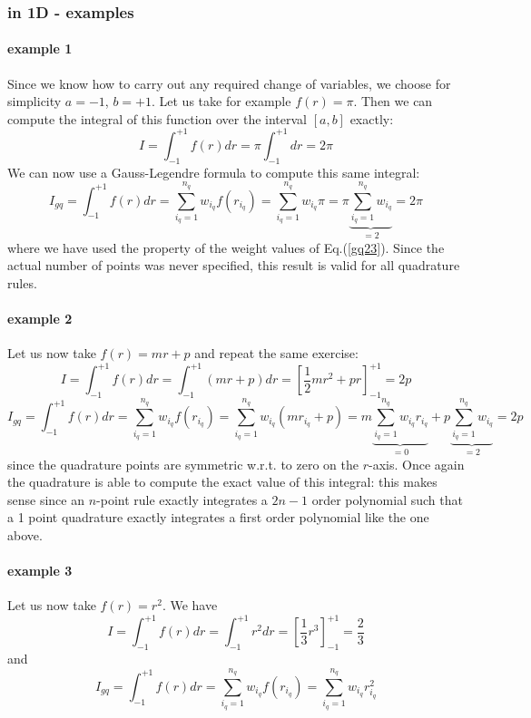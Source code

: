 \subsubsection{in 1D - examples}

\paragraph{example 1}

Since we know how to carry out any required change of variables, we choose for simplicity 
$a=-1$, $b=+1$.
Let us take for example $f(r)=\pi$. Then we can compute the integral of this function 
over the interval $[a,b]$ exactly:
\[
I=\int_{-1}^{+1} f(r) dr = \pi \int_{-1}^{+1}dr  = 2 \pi
\]
We can now use a Gauss-Legendre formula to compute this same integral:
\[
I_{gq}=\int_{-1}^{+1} f(r) dr
= \sum_{i_q=1}^{n_q} w_{i_q} f(r_{i_q}) 
= \sum_{i_q=1}^{n_q} w_{i_q} \pi
= \pi \underbrace{\sum_{i_q=1}^{n_q} w_{i_q} }_{=2}
= 2 \pi
\]
where we have used the property of the weight values of Eq.(\ref{gq23}).
Since the actual number of points was never specified, this result is valid for all 
quadrature rules.


\paragraph{example 2}

Let us now take $f(r)=m r+ p$ and repeat the same exercise:
\[
I=\int_{-1}^{+1} f(r) dr = \int_{-1}^{+1} (mr+p) dr  =  [\frac{1}{2} m r^2 + p r ]_{-1}^{+1} =2p
\]
\[
I_{gq}=\int_{-1}^{+1} f(r) dr
\!= \sum_{i_q=1}^{n_q} w_{i_q} f(r_{i_q}) 
\!= \sum_{i_q=1}^{n_q} w_{i_q} (m r_{i_q} + p)  
\!= m \underbrace{\sum_{i_q=1}^{n_q} w_{i_q} r_{i_q}}_{=0}  + p \underbrace{\sum_{i_q=1}^{n_q} w_{i_q}}_{=2}  = 2p
\]
since the quadrature points are symmetric w.r.t. to zero on the $r$-axis.
Once again the quadrature is able to compute the exact value of this integral: this makes sense since 
an $n$-point rule exactly integrates a $2n-1$ order polynomial such that a 1 point quadrature exactly 
integrates a first order polynomial like the one above.



\paragraph{example 3}

Let us now take $f(r)=r^2$. We have 
\[
I=\int_{-1}^{+1} f(r) dr = \int_{-1}^{+1} r^2 dr  =  \left[\frac{1}{3}r^3 \right]_{-1}^{+1} =  \frac{2}{3} 
\]
and 
\[
I_{gq}=\int_{-1}^{+1} f(r) dr 
\!= \sum_{i_q=1}^{n_q} w_{i_q} f(r_{i_q}) 
\!= \sum_{i_q=1}^{n_q} w_{i_q} r_{i_q}^2 
\]

